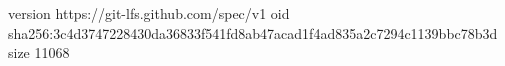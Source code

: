 version https://git-lfs.github.com/spec/v1
oid sha256:3c4d3747228430da36833f541fd8ab47acad1f4ad835a2c7294c1139bbc78b3d
size 11068
